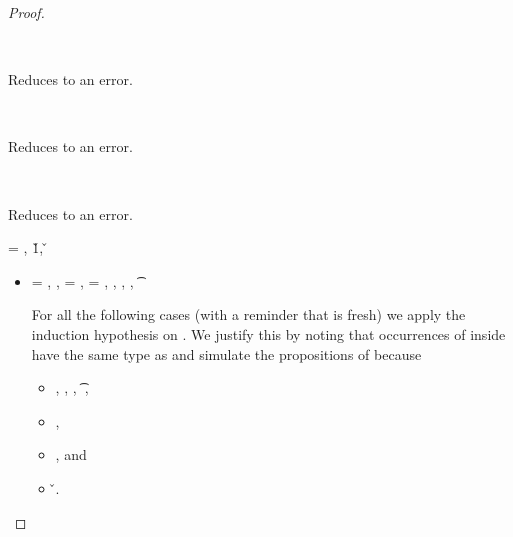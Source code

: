 \begin{lemma}
\begin{proof}
\begin{case}[BE-If]
  \ 

  Reduces to an error.
\end{case}

\begin{case}[BE-IfFalse]
  \ 

  Reduces to an error.
\end{case}

\begin{case}[BE-IfTrue]
  \ 

  Reduces to an error.
\end{case}

\begin{case}[B-Let]
  \e{} = { {} {}},
        \opsem {\openv{}} {} {\v{1}},
         {} {\v{}}


  \begin{itemize}
    \item[]
      \begin{subcase}[T-Let]
  \ep{} = { {} {}},
  \judgementrewrite {\propenv{}} {} {\s{}} { {}}
             {}
             {},
             \propp{} = {\impprop {\notprop {\falsy{}} {\x{}}} {}},
             \proppp{} = {\impprop {\isprop {\falsy{}} {\x{}}} {}},
  \judgementrewrite
       {\propenv{}, {\isprop {\s{}} {\x{}}},
         {\propp{}},
         {\proppp{}}}
             {} {\t{}} {\filterset {\thenprop {\prop{}}} {\elseprop {\prop{}}}}
             {\object{}} 
             {}

        For all the following cases (with a reminder that \x{} is fresh)
        we apply the induction hypothesis on . We justify this by noting
        that occurrences of \x{} inside  have the same type as  and 
        simulate the propositions of 
        because 
        \begin{itemize}
          \item
  \judgementrewrite
       {\propenv{}, {\isprop {\s{}} {\x{}}},
         {\propp{}},
         {\proppp{}}}
             {} {\t{}} {\filterset {\thenprop {\prop{}}} {\elseprop {\prop{}}}}
             {\object{}} 
             {},
           \item
        ,
           \item
        {},
        and
           \item
         {} {\v{}}.
    \end{itemize}


\end{subcase}
\end{itemize}
\end{case}
\end{proof}
\end{lemma}
